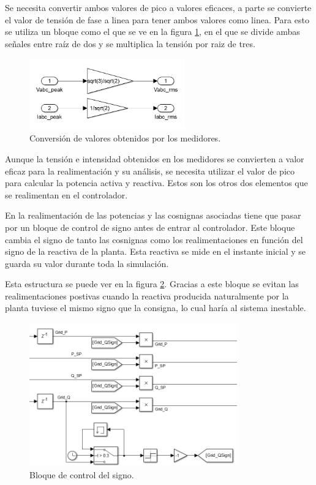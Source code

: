 \documentclass{book}
\begin{document}
Se necesita convertir ambos valores de pico a valores eficaces, a parte se convierte el valor de tensi\'on de fase a linea para tener ambos valores como linea. Para esto se utiliza un bloque como el que se ve en la figura \ref{peak2rms}, en el que se divide ambas señales entre ra\'iz de dos y se multiplica la tensi\'on por raiz de tres. \par

\begin{figure}[h!]
\centering
\includegraphics[width=0.6\textwidth]{peak2rms.PNG}
\caption{Conversi\'on de valores obtenidos por los medidores. }
\label{peak2rms}
\end{figure} \par

Aunque la tensi\'on e intensidad obtenidos en los medidores se convierten a valor eficaz para la realimentaci\'on y su an\'alisis, se necesita utilizar el valor de pico para calcular la potencia activa y reactiva. Estos son los otros dos elementos que se realimentan en el controlador.  \par

En la realimentaci\'on de las potencias y las cosnignas asociadas tiene que pasar por un bloque de control de signo antes de entrar al controlador. Este bloque cambia el signo de tanto las cosnignas como los realimentaciones en funci\'on del signo de la reactiva de la planta. Esta reactiva se mide en el instante inicial y se guarda su valor durante toda la simulaci\'on. \par

Esta estructura se puede ver en la figura \ref{ControlSign}. Gracias a este bloque se evitan las realimentaciones postivas cuando la reactiva producida naturalmente por la planta tuviese el mismo signo que la consigna, lo cual har\'ia al sistema inestable.  \par

\begin{figure}[h!]
\centering
\includegraphics[width=0.8\textwidth]{ControlSign.PNG}
\caption{Bloque de control del signo. }
\label{ControlSign}
\end{figure} \par
\end{document}
